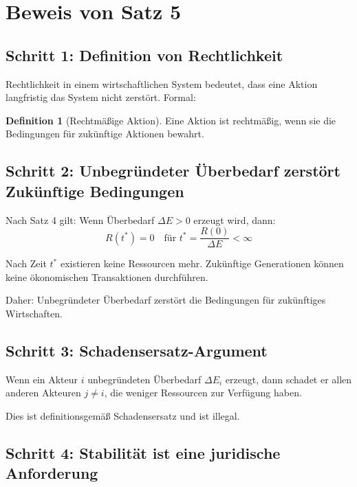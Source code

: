 \documentclass[a4paper,11pt]{report}
\theoremstyle{definition}
\newtheorem{definition}{Definition}[chapter]
\begin{document}
\section{Beweis von Satz 5}

\subsection{Schritt 1: Definition von Rechtlichkeit}

Rechtlichkeit in einem wirtschaftlichen System bedeutet, dass eine Aktion langfristig das System nicht zerstört. Formal:

\begin{definition}[Rechtmäßige Aktion]
    Eine Aktion ist rechtmäßig, wenn sie die Bedingungen für zukünftige Aktionen bewahrt.
\end{definition}

\subsection{Schritt 2: Unbegründeter Überbedarf zerstört Zukünftige Bedingungen}

Nach Satz 4 gilt: Wenn Überbedarf $\Delta E > 0$ erzeugt wird, dann:
\begin{equation}
    R(t^*) = 0 \quad \text{für } t^* = \frac{R(0)}{\Delta E} < \infty
\end{equation}

Nach Zeit $t^*$ existieren keine Ressourcen mehr. Zukünftige Generationen können keine ökonomischen Transaktionen durchführen.

Daher: Unbegründeter Überbedarf zerstört die Bedingungen für zukünftiges Wirtschaften.

\subsection{Schritt 3: Schadensersatz-Argument}

Wenn ein Akteur $i$ unbegründeten Überbedarf $\Delta E_i$ erzeugt, dann schadet er allen anderen Akteuren $j \neq i$, die weniger Ressourcen zur Verfügung haben.

Dies ist definitionsgemäß Schadensersatz und ist illegal.

\subsection{Schritt 4: Stabilität ist eine juridische Anforderung}
\end{document}
